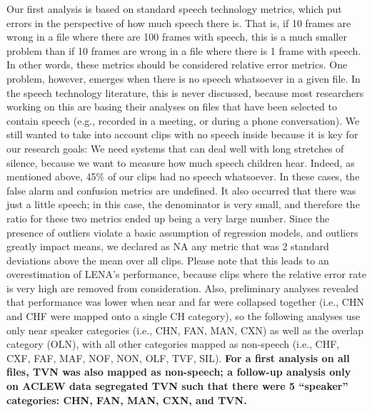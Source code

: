\documentclass[english,floatsintext,man]{apa6}
\begin{document}
Our first analysis is based on standard speech technology metrics, which
put errors in the perspective of how much speech there is. That is, if
10 frames are wrong in a file where there are 100 frames with speech,
this is a much smaller problem than if 10 frames are wrong in a file
where there is 1 frame with speech. In other words, these metrics should
be considered relative error metrics. One problem, however, emerges when
there is no speech whatsoever in a given file. In the speech technology
literature, this is never discussed, because most researchers working on
this are basing their analyses on files that have been selected to
contain speech (e.g., recorded in a meeting, or during a phone
conversation). We still wanted to take into account clips with no speech
inside because it is key for our research goals: We need systems that
can deal well with long stretches of silence, because we want to measure
how much speech children hear. Indeed, as mentioned above, 45\% of our
clips had no speech whatsoever. In these cases, the false alarm and
confusion metrics are undefined. It also occurred that there was just a
little speech; in this case, the denominator is very small, and
therefore the ratio for these two metrics ended up being a very large
number. Since the presence of outliers violate a basic assumption of
regression models, and outliers greatly impact means, we declared as NA
any metric that was 2 standard deviations above the mean over all clips.
Please note that this leads to an overestimation of LENA's performance,
because clips where the relative error rate is very high are removed
from consideration. Also, preliminary analyses revealed that performance
was lower when near and far were collapsed together (i.e., CHN and CHF
were mapped onto a single CH category), so the following analyses use
only near speaker categories (i.e., CHN, FAN, MAN, CXN) as well as the
overlap category (OLN), with all other categories mapped as non-speech
(i.e., CHF, CXF, FAF, MAF, NOF, NON, OLF, TVF, SIL). \textbf{For a first
analysis on all files, TVN was also mapped as non-speech; a follow-up
analysis only on ACLEW data segregated TVN such that there were 5
\enquote{speaker} categories: CHN, FAN, MAN, CXN, and TVN.}
\end{document}
